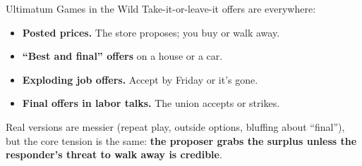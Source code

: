 \begin{frame}{Ultimatum Games in the Wild}
Take-it-or-leave-it offers are everywhere:
\bsk
\begin{itemize}
    \item \textbf{Posted prices.} The store proposes; you buy or walk away.
    \item \textbf{``Best and final'' offers} on a house or a car.
    \item \textbf{Exploding job offers.} Accept by Friday or it's gone.
    \item \textbf{Final offers in labor talks.} The union accepts or strikes.
\end{itemize}
\bsk
Real versions are messier (repeat play, outside options, bluffing about ``final''),
but the core tension is the same: \textbf{the proposer grabs the surplus unless the
responder's threat to walk away is credible}.
\vspace{-0.3in}
\end{frame}




